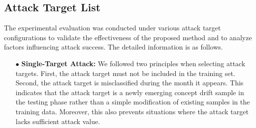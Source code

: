 \documentclass[conference,compsoc]{IEEEtran} %
\begin{document}
\subsection{Attack Target List}
\label{Sec: Attack Target List}
The experimental evaluation was conducted under various attack target configurations to validate the effectiveness of the proposed method and to analyze factors influencing attack success.
The detailed information is as follows.

\begin{itemize}[leftmargin=*]

	\item[$\bullet$] \textbf{Single-Target Attack:} 
	We followed two principles when selecting attack targets.
	First, the attack target must not be included in the training set.
	Second, the attack target is misclassified during the month it appears.
	This indicates that the attack target is a newly emerging concept drift sample in the testing phase rather than a simple modification of existing samples in the training data.
	Moreover, this also prevents situations where the attack target lacks sufficient attack value.


\end{itemize}
\end{document}
